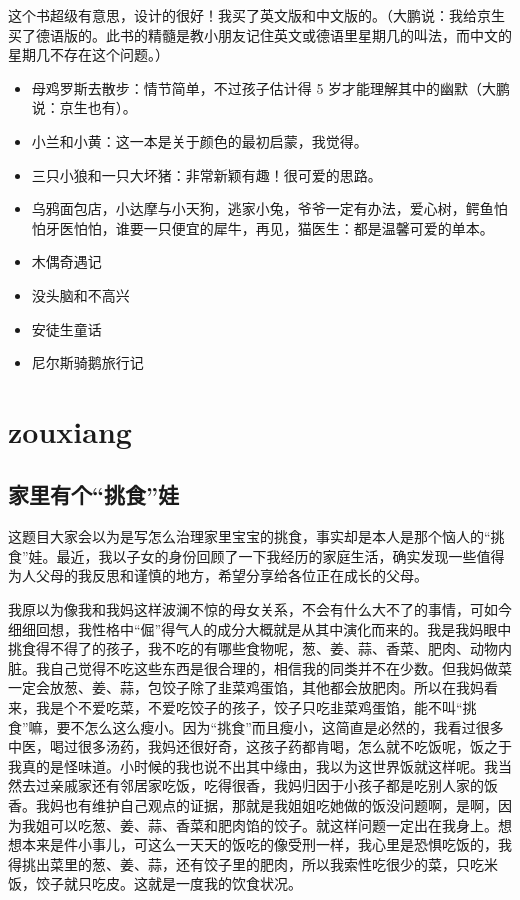 \documentclass[twoside,openright,headings=optiontohead]{ctexbook} %
\begin{document}
{这个书超级有意思，设计的很好！我买了英文版和中文版的。（大鹏说：我给京生买了德语版的。此书的精髓是教小朋友记住英文或德语里星期几的叫法，而中文的星期几不存在这个问题。）

\begin{itemize}
\item
  母鸡罗斯去散步：情节简单，不过孩子估计得 5
  岁才能理解其中的幽默（大鹏说：京生也有）。
\item
  小兰和小黄：这一本是关于颜色的最初启蒙，我觉得。
\item
  三只小狼和一只大坏猪：非常新颖有趣！很可爱的思路。
\item
  乌鸦面包店，小达摩与小天狗，逃家小兔，爷爷一定有办法，爱心树，鳄鱼怕怕牙医怕怕，谁要一只便宜的犀牛，再见，猫医生：都是温馨可爱的单本。
\item
  木偶奇遇记
\item
  没头脑和不高兴
\item
  安徒生童话
\item
  尼尔斯骑鹅旅行记
\end{itemize}

\part{zouxiang}\label{zouxiang}

\chapter*{\texorpdfstring{家里有个``挑食''娃}{家里有个挑食娃}}\label{food-picking}

这题目大家会以为是写怎么治理家里宝宝的挑食，事实却是本人是那个恼人的``挑食''娃。最近，我以子女的身份回顾了一下我经历的家庭生活，确实发现一些值得为人父母的我反思和谨慎的地方，希望分享给各位正在成长的父母。

我原以为像我和我妈这样波澜不惊的母女关系，不会有什么大不了的事情，可如今细细回想，我性格中``倔''得气人的成分大概就是从其中演化而来的。我是我妈眼中挑食得不得了的孩子，我不吃的有哪些食物呢，葱、姜、蒜、香菜、肥肉、动物内脏。我自己觉得不吃这些东西是很合理的，相信我的同类并不在少数。但我妈做菜一定会放葱、姜、蒜，包饺子除了韭菜鸡蛋馅，其他都会放肥肉。所以在我妈看来，我是个不爱吃菜，不爱吃饺子的孩子，饺子只吃韭菜鸡蛋馅，能不叫``挑食''嘛，要不怎么这么瘦小。因为``挑食''而且瘦小，这简直是必然的，我看过很多中医，喝过很多汤药，我妈还很好奇，这孩子药都肯喝，怎么就不吃饭呢，饭之于我真的是怪味道。小时候的我也说不出其中缘由，我以为这世界饭就这样呢。我当然去过亲戚家还有邻居家吃饭，吃得很香，我妈归因于小孩子都是吃别人家的饭香。我妈也有维护自己观点的证据，那就是我姐姐吃她做的饭没问题啊，是啊，因为我姐可以吃葱、姜、蒜、香菜和肥肉馅的饺子。就这样问题一定出在我身上。想想本来是件小事儿，可这么一天天的饭吃的像受刑一样，我心里是恐惧吃饭的，我得挑出菜里的葱、姜、蒜，还有饺子里的肥肉，所以我索性吃很少的菜，只吃米饭，饺子就只吃皮。这就是一度我的饮食状况。

}
\end{document}
